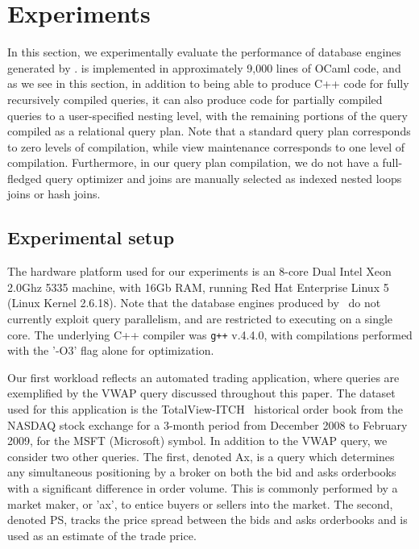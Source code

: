\section{Experiments}

In this section, we experimentally evaluate the performance of database engines
generated by \compiler. \compiler is implemented in approximately 9,000 lines of
OCaml code, and as we see in this section, in addition to being able to produce
C++ code for fully recursively compiled queries, it can also produce code for
partially compiled queries to a user-specified nesting level, with the remaining
portions of the query compiled as a relational query plan. Note that a standard
query plan corresponds to zero levels of compilation, while view maintenance
corresponds to one level of compilation. Furthermore, in our query plan
compilation, we do not have a full-fledged query optimizer and joins are
manually selected as indexed nested loops joins or hash joins.

\subsection{Experimental setup}
The hardware platform used for our experiments is an 8-core Dual Intel Xeon
2.0Ghz 5335 machine, with 16Gb RAM, running Red Hat Enterprise Linux 5 (Linux
Kernel 2.6.18). Note that the database engines produced by \compiler\ do not
currently exploit query parallelism, and are restricted to executing on a single
core. The underlying C++ compiler was \texttt{g++} v.4.4.0, with compilations
performed with the '-O3' flag alone for optimization.

Our first workload reflects an automated trading application, where queries are
exemplified by the VWAP query discussed throughout this paper.  The dataset used
for this application is the TotalView-ITCH~\cite{totalview-url} historical order
book from the NASDAQ stock exchange for a 3-month period from December 2008 to
February 2009, for the MSFT (Microsoft) symbol. In addition to the VWAP query,
we consider two other queries. The first, denoted Ax, is a query which
determines any simultaneous positioning by a broker on both the bid and asks
orderbooks with a significant difference in order volume. This is commonly
performed by a market maker, or 'ax', to entice buyers or sellers into the
market. The second, denoted PS, tracks the price spread between the bids and
asks orderbooks and is used as an estimate of the trade price.


